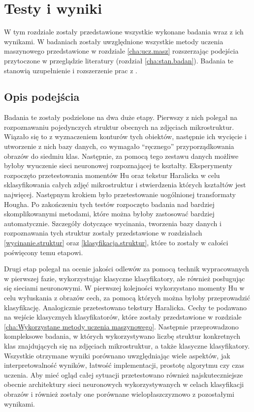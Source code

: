 \chapter{Testy i wyniki}
\label{cha5}

W tym rozdziale zostały przedstawione wszystkie wykonane badania wraz z ich wynikami. W badaniach zostały uwzględnione wszystkie metody uczenia maszynowego przedstawione w rozdziale \ref{cha:ucz.masz} rozszerzając podejścia przytoczone w przeglądzie literatury (rozdział \ref{cha:stan.badan}). Badania te stanowią uzupełnienie i rozszerzenie prac z \cite{Reczek21}. 

\section{Opis podejścia}
\label{opis_podejścia}
Badania te zostały podzielone na dwa duże etapy. Pierwszy z nich polegał na rozpoznawaniu pojedynczych struktur obecnych na zdjęciach mikrostruktur. Wiązało się to z wyznaczeniem konturów tych obiektów, następnie ich wycięcie i utworzenie z nich bazy danych, co wymagało “ręcznego” przyporządkowania obrazów do siedmiu klas. Następnie, za pomocą tego zestawu danych możliwe byłoby wyuczenie sieci neuronowej rozpoznającej te kształty. Eksperymenty rozpoczęto przetestowania momentów Hu oraz tekstur Haralicka w celu sklasyfikowania całych zdjęć mikrostruktur i stwierdzenia których kształtów jest najwięcej. Następnym krokiem było przetestowanie uogólnionej transformaty Hougha. Po zakończeniu tych testów rozpoczęto badania nad bardziej skomplikowanymi metodami, które można byłoby zastosować bardziej automatycznie. Szczegóły dotyczące wycinania, tworzenia bazy danych i rozpoznawania tych struktur zostały przedstawione w rozdziałach \ref{wycinanie.struktur} oraz \ref{klasyfikacja.struktur}, które to zostały w całości poświęcony temu etapowi.

Drugi etap polegał na ocenie jakości odlewów za pomocą technik wypracowanych w pierwszej fazie, wykorzystując klasyczne klasyfikatory, ale również posługując się sieciami neuronowymi. W pierwszej kolejności wykorzystano momenty Hu w celu wyłuskania z obrazów cech, za pomocą których można byłoby przeprowadzić klasyfikację. Analogicznie przetestowano tekstury Haralicka. Cechy te podawano na wejście klasycznych klasyfikatorów, które zostały przedstawione w rozdziale \ref{cha:Wykorzystane metody uczenia maszynowego}. Następnie przeprowadzono kompleksowe badania, w których wykorzystywano liczbę struktur konkretnych klas znajdujących się na zdjęciach mikrostruktur, a także klasyczne klasyfikatory. Wszystkie otrzymane wyniki porównano uwzględniając wiele aspektów, jak interpretowalność wyników, łatwość implementacji, prostotę algorytmu czy czas uczenia. Aby mieć ogląd całej sytuacji przetestowano również najskuteczniejsze obecnie architektury sieci neuronowych wykorzystywanych w celach klasyfikacji obrazów i również zostały one porównane wielopłaszczyznowo z pozostałymi wynikami.

